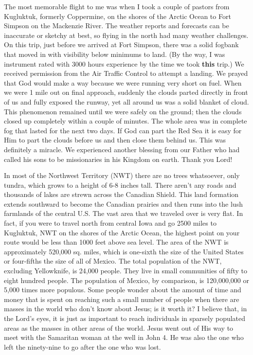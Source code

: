 \documentclass[oneside]{book}
\begin{document}
The most memorable flight to me was when I took a couple of pastors from Kugluktuk, formerly Coppermine, on the shores of the Arctic Ocean to Fort Simpson on the Mackenzie River. The weather reports and forecasts can be inaccurate or sketchy at best, so flying in the north had many weather challenges. On this trip, just before we arrived at Fort Simpson, there was a solid fogbank that moved in with visibility below minimums to land. (By the way, I was instrument rated with 3000 hours experience by the time we took \textbf{this} trip.) We received permission from the Air Traffic Control to attempt a landing. We prayed that God would make a way because we were running very short on fuel. When we were 1 mile out on final approach, suddenly the clouds parted directly in front of us and fully exposed the runway, yet all around us was a solid blanket of cloud. This phenomenon remained until we were safely on the ground; then the clouds closed up completely within a couple of minutes. The whole area was in complete fog that lasted for the next two days. If God can part the Red Sea it is easy for Him to part the clouds before us and then close them behind us. This was definitely a miracle. We experienced another blessing from our Father who had called his sons to be missionaries in his Kingdom on earth. Thank you Lord!

In most of the Northwest Territory (NWT) there are no trees whatsoever, only tundra, which grows to a height of 6-8 inches tall. There aren't any roads and thousands of lakes are strewn across the Canadian Shield. This land formation extends southward to become the Canadian prairies and then runs into the lush farmlands of the central U.S. The vast area that we traveled over is very flat. In fact, if you were to travel north from central Iowa and go 2500 miles to Kugluktuk, NWT on the shores of the Arctic Ocean, the highest point on your route would be less than 1000 feet above sea level. The area of the NWT is approximately 520,000 sq. miles, which is one-sixth the size of the United States or four-fifths the size of all of Mexico. The total population of the NWT, excluding Yellowknife, is 24,000 people. They live in small communities of fifty to eight hundred people. The population of Mexico, by comparison, is 120,000,000 or 5,000 times more populous. Some people wonder about the amount of time and money that is spent on reaching such a small number of people when there are masses in the world who don't know about Jesus; is it worth it? I believe that, in the Lord's eyes, it is just as important to reach individuals in sparsely populated areas as the masses in other areas of the world. Jesus went out of His way to meet with the Samaritan woman at the well in John 4. He was also the one who left the ninety-nine to go after the one who was lost.
\end{document}
